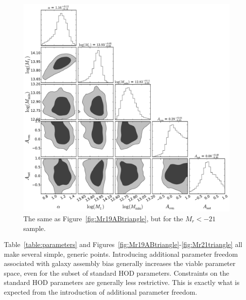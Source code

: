 \documentclass[usenatbib,usegraphicx,letterpaper]{mn2e}
\begin{document}
\begin{figure}
\begin{center}
\includegraphics[width=15.0cm]{Mr21ABTri.pdf}
\caption{
The same as Figure~\ref{fig:Mr19ABtriangle}, but for the $M_r<-21$ sample.
}
\label{fig:Mr21ABtriangle}
\end{center}
\end{figure}


Table~\ref{table:parameters} and Figures~\ref{fig:Mr19ABtriangle}-\ref{fig:Mr21triangle} 
all make several simple, generic points. Introducing additional parameter 
freedom associated with galaxy assembly bias generally increases the viable parameter 
space, even for the subset of standard HOD parameters. Constraints on the 
standard HOD parameters are generally less restrictive. This is exactly what is 
expected from the introduction of additional parameter freedom. 
\end{document}
